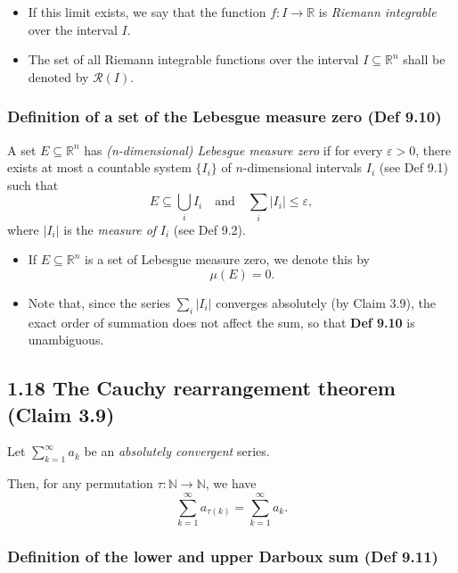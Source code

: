 \begin{itemize}
    \item If this limit exists, we say that the function $f: I \to \mathbb{R}$ is \textit{Riemann integrable} over the interval $I$.
    \item The set of all Riemann integrable functions over the interval \(I \subseteq \mathbb{R}^n\) shall be denoted by \(\mathcal{R}(I)\).
\end{itemize}

\subsubsection{Definition of a set of the Lebesgue measure zero (Def 9.10)}

A set $E \subseteq \mathbb{R}^n$ has \textit{(n-dimensional) Lebesgue measure zero} if for every $\varepsilon > 0$, there exists at most a countable system $\{I_i\}$ of $n$-dimensional intervals $I_i$ (see Def 9.1) such that
\[
    E \subseteq \bigcup_i I_i \quad \text{and} \quad \sum_i |I_i| \leq \varepsilon,
\]
where $|I_i|$ is the \textit{measure of} $I_i$ (see Def 9.2).

\begin{itemize}
    \item If $E \subseteq \mathbb{R}^n$ is a set of Lebesgue measure zero, we denote this by
    \[
        \mu(E) = 0.
    \]
    \item Note that, since the series $\sum_i |I_i|$ converges absolutely (by Claim 3.9), the exact order of summation does not affect the sum, so that \textbf{Def 9.10} is unambiguous.
\end{itemize}
\subsection*{1.18 The Cauchy rearrangement theorem (Claim 3.9)}


\begin{claim}
    Let $\sum_{k=1}^\infty a_k$ be an \textit{absolutely convergent} series.

    Then, for any permutation $\tau : \mathbb{N} \to \mathbb{N}$, we have
    \[
        \sum_{k=1}^\infty a_{\tau(k)} = \sum_{k=1}^\infty a_k.
    \]
\end{claim}

\subsubsection{Definition of the lower and upper Darboux sum (Def 9.11)}

